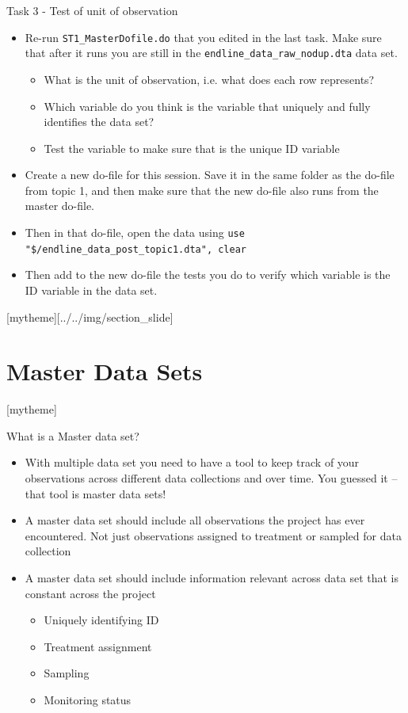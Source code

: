\documentclass[aspectratio=169]{beamer}
\newcommand{\sectionpic}[2]{
	\setbeamertemplate{section page}[mytheme][#2]
	\section{#1}
	\setbeamertemplate{section page}[mytheme]
}
\begin{document}
\begin{frame}{Task 3 - Test of unit of observation}
	\begin{itemize}
		\item Re-run \texttt{ST1\_MasterDofile.do} that you edited in the last task. Make sure that after it runs you are still in the \texttt{endline\_data\_raw\_nodup.dta} data set.
		\begin{itemize}
			\item What is the unit of observation, i.e. what does each row represents?
			\item Which variable do you think is the variable that uniquely and fully identifies the data set?
			\item Test the variable to make sure that is the unique ID variable
		\end{itemize}
		\item Create a new do-file for this session. Save it in the same folder as the do-file from topic 1, and then make sure that the new do-file also runs from the master do-file. 
		\item Then in that do-file, open the data using \newline \texttt{use "\$/endline\_data\_post\_topic1.dta", clear}
		\item Then add to the new do-file the tests you do to verify which variable is the ID variable in the data set.
	\end{itemize}
\end{frame}

\sectionpic{Master Data Sets}{../../img/section_slide}


\begin{frame}{What is a Master data set?}
	\begin{itemize}
		\item With multiple data set you need to have a tool to keep track of your observations across different data collections and over time. You guessed it – that tool is master data sets!
		\item A master data set should include all observations the project has ever encountered. Not just observations assigned to treatment or sampled for data collection
		\item A master data set should include information relevant across data set that is constant across the project
		\begin{itemize}
			\item Uniquely identifying ID
			\item Treatment assignment
			\item Sampling
			\item Monitoring status
		\end{itemize}
	\end{itemize}
\end{frame}
\end{document}
